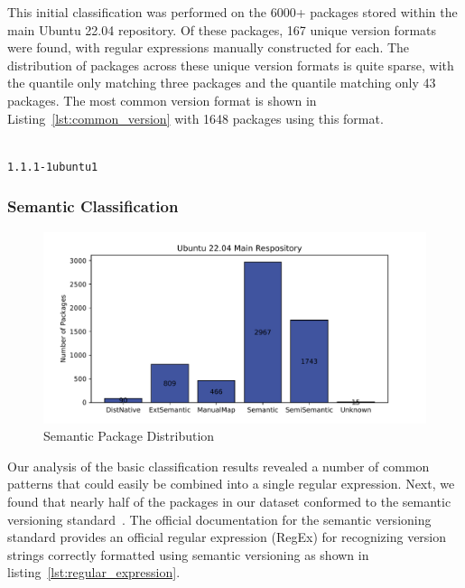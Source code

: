\documentclass[sn-mathphys-num]{sn-jnl}%
\theoremstyle{thmstyleone}%
\theoremstyle{thmstyletwo}%
\theoremstyle{thmstylethree}%
\begin{document}
This initial classification was performed on the 6000+ packages stored within the main Ubuntu 22.04 repository. Of these packages, 167 unique version formats were found, with regular expressions manually constructed for each. The distribution of packages across these unique version formats is quite sparse, with the  quantile only matching three packages and the  quantile matching only 43 packages. The most common version format is shown in Listing~\ref{lst:common_version} with 1648 packages using this format. 


\begin{lstlisting}[caption={Most Common Version Format},captionpos=b, label=lst:common_version]

1.1.1-1ubuntu1  

\end{lstlisting}



\subsubsection{\textbf{Semantic Classification}}

\begin{figure}[htbp]
    \centering
    \includegraphics[width=\columnwidth]{figures/semantic-class-histogram.pdf}
    \caption{Semantic Package Distribution}
    \label{fig:semantic-class-histogram}
\end{figure}

Our analysis of the basic classification results revealed a number of common patterns that could easily be combined into a single regular expression. Next, we found that nearly half of the packages in our dataset conformed to the semantic versioning standard~\cite{preston-werner_semantic_nodate}. The official documentation for the semantic versioning standard provides an official regular expression (RegEx) for recognizing version strings correctly formatted using semantic versioning as shown in listing~\ref{lst:regular_expression}.
\end{document}

